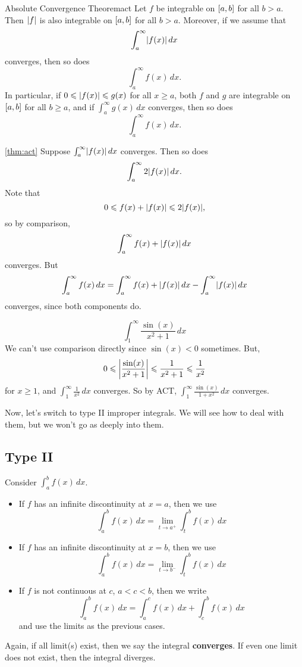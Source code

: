 \begin{Theorem}{Absolute Convergence Theorem}{act}
    Let $ f $ be integrable on $ \interval{a}{b} $ for all $ b>a $.
    Then $ \abs{f} $ is also integrable on $ \interval{a}{b} $ for all $ b>a $.
    Moreover, if we assume that
    \[ \int_{a}^{\infty} \abs{f(x)}\, d{x} \]
    converges, then so does
    \[ \int_{a}^{\infty} f(x)\, d{x}. \]
    In particular, if $ 0\leqslant \abs{f(x)}\leqslant g(x) $ for all $ x\geqslant a $,
    both $ f $ and $ g $ are integrable on $ \interval{a}{b} $ for all $ b\geqslant a $,
    and if $ \int_{a}^{\infty} g(x)\, d{x}  $ converges, then so does
    \[ \int_{a}^{\infty} f(x)\, d{x}. \]
\end{Theorem}

\begin{Proof}{\ref{thm:act}}{}
    Suppose $ \int_{a}^{\infty} \abs{f(x)}\, d{x} $ converges. Then so does
    \[ \int_{a}^{\infty} 2\abs{f(x)}\, d{x}. \]
    Note that
    \[ 0\leqslant f(x)+\abs{f(x)}\leqslant 2\abs{f(x)}, \]
    so by comparison,
    \[ \int_{a}^{\infty} f(x)+\abs{f(x)}\, d{x} \]
    converges. But
    \[ \int_{a}^{\infty} f(x)\, d{x} =\int_{a}^{\infty} f(x)+\abs{f(x)}\, d{x} -
        \int_{a}^{\infty} \abs{f(x)}\, d{x}  \]
    converges, since both components do.
\end{Proof}

\begin{Example}{}{}
    \[ \int_{1}^{\infty} \frac{\sin(x)}{x^2+1} \, d{x} \]
    We can't use comparison directly since $ \sin(x)<0 $ sometimes. But,
    \[ 0\leqslant \abs*{\frac{\sin(x)}{x^2+1} }\leqslant \frac{1}{x^2+1} \leqslant \frac{1}{x^2} \]
    for $ x\geqslant 1 $, and $ \int_{1}^{\infty} \frac{1}{x^2} \, d{x}  $ converges. So by
    ACT, $ \int_{1}^{\infty} \frac{\sin(x)}{1+x^2} \, d{x}  $ converges.
\end{Example}

Now, let's switch to type II improper integrals. We will see how to deal with them, but we won't
go as deeply into them.

\subsection{Type II}
Consider $ \int_{a}^{b} f(x)\, d{x}  $.
\begin{itemize}
    \item If $ f $ has an infinite discontinuity at $ x=a $, then we use
          \[ \int_{a}^{b} f(x)\, d{x} =\lim\limits_{{t} \to {a^+}} \int_{t}^{b} f(x)\, d{x} \]
    \item If $ f $ has an infinite discontinuity at $ x=b $, then we use
          \[ \int_{a}^{b} f(x)\, d{x} =\lim\limits_{{t} \to {b^-}} \int_{t}^{b} f(x)\, d{x} \]
    \item If $ f $ is not continuous at $ c $, $ a<c<b $, then we write
          \[  \int_{a}^{b} f(x)\, d{x} =\int_{a}^{c} f(x)\, d{x} +\int_{c}^{b} f(x)\, d{x} \]
          and use the limits as the previous cases.
\end{itemize}
Again, if all limit(s) exist, then we say the integral \textbf{converges}. If even one
limit does not exist, then the integral diverges.

